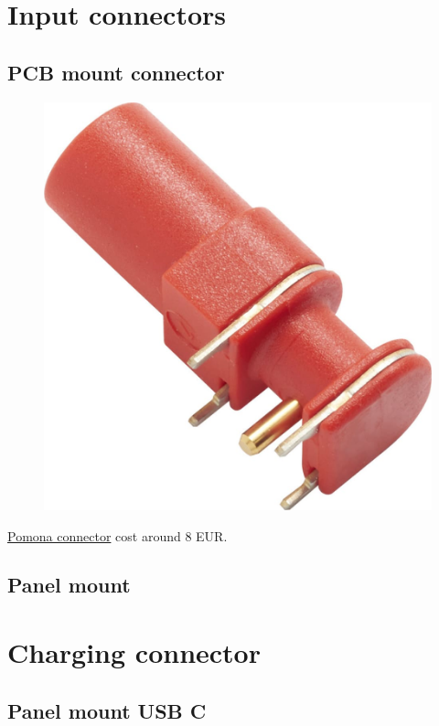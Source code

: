 \documentclass[11pt]{article}
\begin{document}
\section{Input connectors}

\subsection{PCB mount connector}

\begin{figure}[H]
  \centering 
  \includegraphics[scale=0.1]{"./figs/pomona.jpg"}
\end{figure}



\href{https://www.mouser.co.uk/ProductDetail/Pomona-Electronics/73099-2?qs=B6kkDfuK7%2FA6DpEPKtHqWw%3D%3D}{Pomona connector} 
  cost around 8 EUR.


\subsection{Panel mount}

\section{Charging connector}
\subsection{Panel mount USB C}
\end{document}

